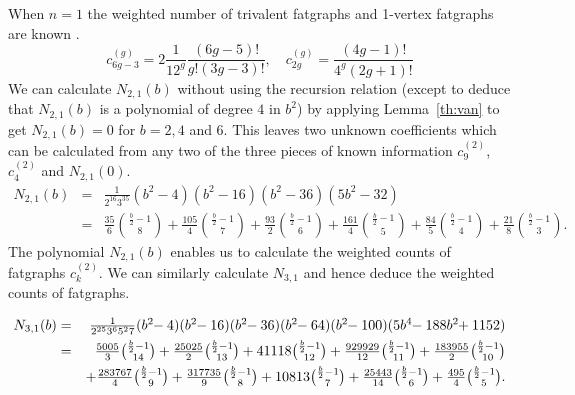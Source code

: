 \documentclass{amsart}
\begin{document}
When $n=1$ the weighted number of trivalent fatgraphs and 1-vertex fatgraphs are known \cite{WLeCou}.
\[ c_{6g-3}^{(g)}=2\frac{1}{12^g}\frac{(6g-5)!}{g!(3g-3)!},\quad c_{2g}^{(g)}=\frac{(4g-1)!}{4^g(2g+1)!}\]
We can calculate $N_{2,1}(b)$ without using the recursion relation (except to deduce that $N_{2,1}(b)$ is a polynomial of degree $4$ in $b^2$) by applying Lemma~\ref{th:van} to get $N_{2,1}(b)=0$ for $b=2,4$ and 6.  This leaves two unknown coefficients which can be calculated from any two of the three pieces of known information $c_9^{(2)}$, $c_4^{(2)}$ and $N_{2,1}(0)$.
\begin{eqnarray*}
N_{2,1}(b)&=&\frac{1}{2^{16}3^35}\left(b^2-4\right)\left(b^2-16\right)\left(b^2-36\right)\left(5b^2-32\right)\\
&=&\textstyle\frac{35}{6}\binom{\frac{b}{2}-1}{8}+\frac{105}{4}\binom{\frac{b}{2}-1}{7}+\frac{93}{2}\binom{\frac{b}{2}-1}{6}+\frac{161}{4}\binom{\frac{b}{2}-1}{5}+\frac{84}{5}\binom{\frac{b}{2}-1}{4}+\frac{21}{8}\binom{\frac{b}{2}-1}{3}.
\end{eqnarray*}
The polynomial $N_{2,1}(b)$ enables us to calculate the weighted counts of fatgraphs $c_k^{(2)}$.  We can similarly calculate $N_{3,1}$ and hence deduce the weighted counts of fatgraphs.

\begin{eqnarray*}
N_{3,1}(b)&=&\textstyle\frac{1}{2^{25}3^65^27}(b^2\hspace{-1mm}-4)(b^2\hspace{-1mm}-16)(b^2\hspace{-1mm}-36)(b^2\hspace{-1mm}-64)(b^2\hspace{-1mm}-100)(5b^4\hspace{-1mm}-188b^2\hspace{-1mm}+1152)\\
&=&\textstyle\frac{5005}{3}\binom{\frac{b}{2}-1}{14}+\frac{25025}{2}\binom{\frac{b}{2}-1}{13}+41118\binom{\frac{b}{2}-1}{12}+\frac{929929}{12}\binom{\frac{b}{2}-1}{11}+\frac{183955}{2}\binom{\frac{b}{2}-1}{10}\\&&\textstyle+\frac{283767}{4}\binom{\frac{b}{2}-1}{9}+\frac{317735}{9}\binom{\frac{b}{2}-1}{8}+10813\binom{\frac{b}{2}-1}{7}+\frac{25443}{14}\binom{\frac{b}{2}-1}{6}+\frac{495}{4}\binom{\frac{b}{2}-1}{5}.
\end{eqnarray*}
\end{document}
